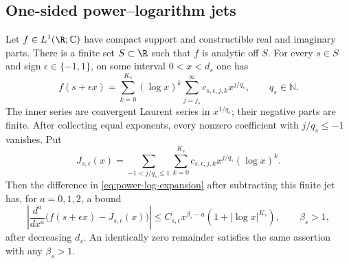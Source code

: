 \subsection{One-sided power--logarithm jets}
\begin{lemma}
\label{lem:power-log-jet}
Let $f\in L^1(\R;\mathbb C)$ have compact support and constructible
real and imaginary parts. There is a finite set $S\subset\R$ such that
$f$ is analytic off $S$. For every $s\in S$ and sign
$\epsilon\in\{-1,1\}$, on some interval $0<x<d_s$ one has
\begin{equation}\label{eq:power-log-expansion}
 f(s+\epsilon x)=\sum_{k=0}^{K_s}(\log x)^k
                         \sum_{j=j_s}^{\infty}c_{s,\epsilon,j,k}x^{j/q_s},
 \qquad q_s\in\mathbb N.
\end{equation}
The inner series are convergent Laurent series in $x^{1/q_s}$; their
negative parts are finite. After collecting equal exponents, every
nonzero coefficient with $j/q_s\le-1$ vanishes. Put
\begin{equation}\label{eq:power-log-jet}
 J_{s,\epsilon}(x)=
    \sum_{-1<j/q_s\le1}\sum_{k=0}^{K_s}
                           c_{s,\epsilon,j,k}x^{j/q_s}(\log x)^k.
\end{equation}
Then the difference in \eqref{eq:power-log-expansion} after subtracting
this finite jet has, for $a=0,1,2$, a bound
\begin{equation}\label{eq:power-log-remainder}
 \left|\frac{d^a}{dx^a}
       \bigl(f(s+\epsilon x)-J_{s,\epsilon}(x)\bigr)\right|
 \le C_{s,\epsilon}x^{\beta_s-a}(1+|\log x|^{K_s}),
 \qquad \beta_s>1,
\end{equation}
after decreasing $d_s$. An identically zero remainder satisfies the
same assertion with any $\beta_s>1$.
\end{lemma}
